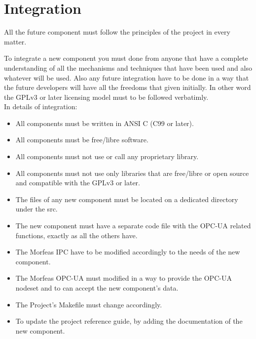 \newpage
\section{Integration}
All the future component must follow the principles of the project in every matter.

To integrate a new component you must done from anyone that have a complete understanding of all the mechanisms and techniques that have been used and also whatever will be used. 
Also any future integration have to be done in a way that the future developers will have all the freedoms that given initially. 
In other word the GPLv3 or later licensing model must to be followed verbatimly.\\

In details of integration:
\begin{itemize}
	\item All components must be written in ANSI C (C99 or later).
	\item All components must be free/libre software.
	\item All components must not use or call any proprietary library.
	\item All components must not use only libraries that are free/libre or open source and compatible with the GPLv3 or later.
	\item The files of any new component must be located on a dedicated directory under the src.  
	\item The new component must have a separate code file with the OPC-UA related functions, exactly as all the others have. 
	\item The Morfeas IPC have to be modified accordingly to the needs of the new component.
	\item The Morfeas OPC-UA must modified in a way to provide the OPC-UA nodeset and to can accept the new component's data.
	\item The Project's Makefile must change accordingly.
	\item To update the project reference guide, by adding the documentation of the new component.
\end{itemize}